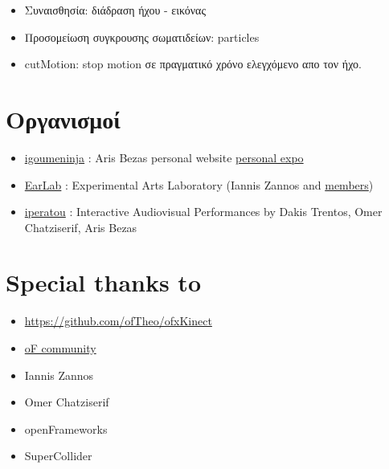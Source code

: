 \documentclass[11pt]{article}
\begin{document}
\begin{itemize}
\item Συναισθησία: διάδραση ήχου - εικόνας
\item Προσομείωση συγκρουσης σωματιδείων: particles
\item cutMotion: stop motion σε πραγματικό χρόνο ελεγχόμενο απο τον ήχο.
\end{itemize}
\section{Οργανισμοί}
\label{sec-5}


\begin{itemize}
\item \href{http://igoumeninja.org/}{igoumeninja} : Aris Bezas personal website \href{http://igoumeninja.org/en/pmwiki.php/Exposition/Exposition}{personal expo}
\item \href{http://earlab.org/}{EarLab} : Experimental Arts Laboratory (Iannis Zannos and \href{http://earlab.org/pmwiki.php?n=Members/HomePage}{members})
\item \href{http://iperatou.com/}{iperatou} : Interactive Audiovisual Performances by Dakis Trentos, Omer Chatziserif, Aris Bezas
\end{itemize}
\section{Special thanks to}
\label{sec-6}

\begin{itemize}
\item \href{https://github.com/ofTheo/ofxKinect}{https://github.com/ofTheo/ofxKinect}
\item \href{http://forum.openframeworks.cc/index.php?topic=4947.0}{oF community}
\item Iannis Zannos
\item Omer Chatziserif
\item openFrameworks
\item SuperCollider
\end{itemize}
\end{document}

